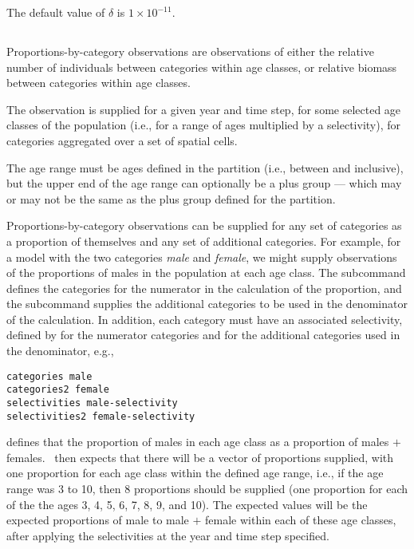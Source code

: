 The default value of $\delta$ is $1 \times 10^{-11}$.

\subsection{\label{sec:proportions-by-category}}
Proportions-by-category observations are observations of either the relative number of individuals between categories within age classes, or relative biomass between categories within age classes. 

The observation is supplied for a given year and time step, for some selected age classes of the population (i.e., for a range of ages multiplied by a selectivity), for categories aggregated over a set of spatial cells. 

The age range must be ages defined in the partition (i.e., between  and  inclusive), but the upper end of the age range can optionally be a plus group --- which may or may not be the same as the plus group defined for the partition. 

Proportions-by-category observations can be supplied for any set of categories as a proportion of themselves and any set of additional categories. For example, for a model with the two categories \emph{male} and \emph{female}, we might supply observations of the proportions of males in the population at each age class. The subcommand  defines the categories for the numerator in the calculation of the proportion, and the subcommand  supplies the additional categories to be used in the denominator of the calculation. In addition, each category must have an associated selectivity, defined by  for the numerator categories and  for the additional categories used in the denominator, e.g., 

\begin{verbatim}
categories male
categories2 female
selectivities male-selectivity
selectivities2 female-selectivity
\end{verbatim}

defines that the proportion of males in each age class as a proportion of males $+$ females. \SPM\ then expects that there will be a vector of proportions supplied, with one proportion for each age class within the defined age range, i.e., if the age range was 3 to 10, then 8 proportions should be supplied (one proportion for each of the the ages 3, 4, 5, 6, 7, 8, 9, and 10). The expected values will be the expected proportions of male to male $+$ female within each of these age classes, after applying the selectivities at the year and time step specified. 

